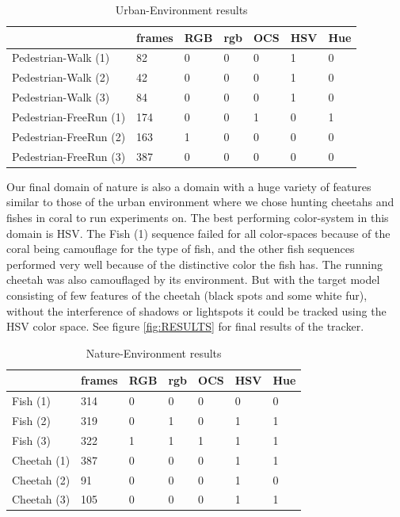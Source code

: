 \documentclass[a4paper,11pt]{article}
\begin{document}
		\begin{table}[H]
			\centering
			\begin{tabular}{ | l | l | l | l | l | l | l |}
			\hline
			                     & frames & RGB & rgb & OCS & HSV & Hue \\
			\hline
			Pedestrian-Walk    (1)&  82 & 0   & 0   & 0   & 1   & 0 \\
			Pedestrian-Walk    (2)&  42 & 0   & 0   & 0   & 1   & 0 \\
			Pedestrian-Walk    (3)&  84 & 0   & 0   & 0   & 1   & 0 \\
			Pedestrian-FreeRun (1)& 174 & 0   & 0   & 1   & 0   & 1 \\
			Pedestrian-FreeRun (2)& 163 & 1   & 0   & 0   & 0   & 0 \\
			Pedestrian-FreeRun (3)& 387 & 0   & 0   & 0   & 0   & 0 \\
			\hline
			\end{tabular}
			\caption{Urban-Environment results}
			\label{table:ped}
		\end{table}
		\noindent
		Our final domain of nature is also a domain with a huge variety of features similar to
		those of the urban environment where we chose hunting cheetahs and fishes in coral to
		run experiments on. The best performing color-system in this domain is HSV. The Fish (1)
		sequence failed for all color-spaces because of the coral being camouflage for the type
		of fish, and the other fish sequences performed very well because of the distinctive color
		the fish has. The running cheetah was also camouflaged by its environment. But with the
		target model consisting of few features of the cheetah (black spots and some white fur),
		without the interference of shadows or lightspots it could be tracked using the HSV color
		space. See figure \ref{fig:RESULTS} for final results of the tracker. 
		\begin{table}[H]
			\centering
			\begin{tabular}{ | l | l | l | l | l | l | l |}
			\hline
			           & frames & RGB & rgb & OCS & HSV & Hue \\
			\hline
			Fish    (1)& 314   & 0   & 0   & 0   & 0   & 0 \\
			Fish    (2)& 319   & 0   & 1   & 0   & 1   & 1 \\
			Fish    (3)& 322   & 1   & 1   & 1   & 1   & 1 \\
			Cheetah (1)& 387   & 0   & 0   & 0   & 1   & 1 \\
			Cheetah (2)&  91   & 0   & 0   & 0   & 1   & 0 \\
			Cheetah (3)& 105   & 0   & 0   & 0   & 1   & 1 \\
			\hline
			\end{tabular}
			\caption{Nature-Environment results}
			\label{table:an}
		\end{table}
\end{document}
